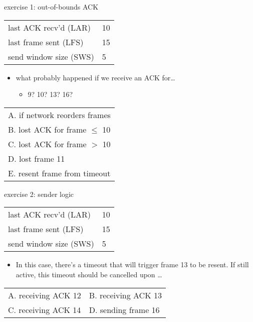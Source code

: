 \begin{frame}{exercise 1: out-of-bounds ACK}
\begin{tabular}{l|l}
last ACK recv'd (LAR) & 10 \\
last frame sent (LFS) & 15 \\
send window size (SWS) & 5 \\
\end{tabular}
\begin{itemize}
\item what probably happened if we receive an ACK for\ldots
    \begin{itemize}
    \item 9? 10? 13? 16?
    \end{itemize}
\end{itemize}
\begin{tabular}{l}
A. if network reorders frames \\
B. lost ACK for frame $\le$ 10\\
C. lost ACK for frame $>$ 10\\
D. lost frame 11 \\
E. resent frame from timeout \\
\end{tabular}
\end{frame}

\begin{frame}{exercise 2: sender logic}
\begin{tabular}{l|l}
last ACK recv'd (LAR) & 10 \\
last frame sent (LFS) & 15 \\
send window size (SWS) & 5 \\
\end{tabular}
\begin{itemize}
\item In this case, there's a timeout that will
trigger frame 13 to be resent. If still active,
this timeout should be cancelled upon \ldots
\end{itemize}
\begin{tabular}{ll}
A. receiving ACK 12 & B. receiving ACK 13 \\
C. receiving ACK 14 & D. sending frame 16 \\
\end{tabular}
\end{frame}

